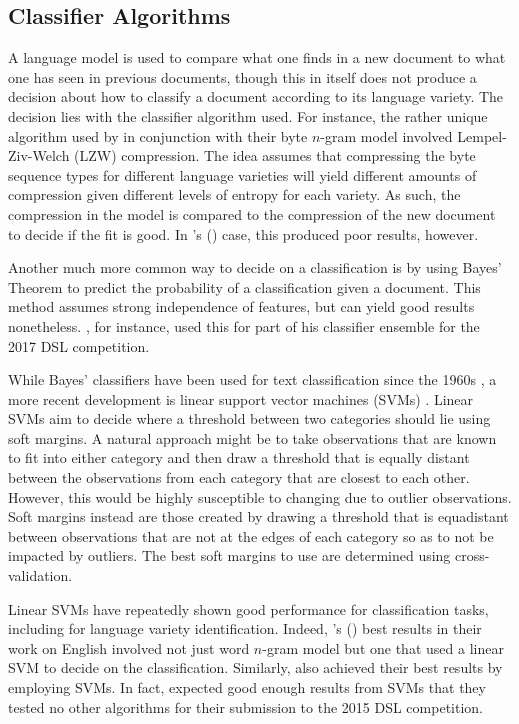 \documentclass{article}
\begin{document}
    \subsection{Classifier Algorithms}
      A language model is used to compare what one finds in a new document to what one has seen in previous documents, though this in itself does not produce a decision about how to classify a document according to its language variety.
      The decision lies with the classifier algorithm used.
      For instance, the rather unique algorithm used by \textcite{maier_language_2014} in conjunction with their byte $n$-gram model involved Lempel-Ziv-Welch (LZW) compression.
      The idea assumes that compressing the byte sequence types for different language varieties will yield different amounts of compression given different levels of entropy for each variety.
      As such, the compression in the model is compared to the compression of the new document to decide if the fit is good.
      In \citeauthor{maier_language_2014}'s (\citeyear{maier_language_2014}) case, this produced poor results, however.

      Another much more common way to decide on a classification is by using Bayes' Theorem to predict the probability of a classification given a document.
      This method assumes strong independence of features, but can yield good results nonetheless.
      \textcite{duvenhage_short_2019}, for instance, used this for part of his classifier ensemble for the 2017 DSL competition.

      While Bayes' classifiers have been used for text classification since the 1960s \parencite{mosteller_inference_1963}, a more recent development is linear support vector machines (SVMs) \parencite{cortes_support-vector_1995}.
      Linear SVMs aim to decide where a threshold between two categories should lie using soft margins.
      A natural approach might be to take observations that are known to fit into either category and then draw a threshold that is equally distant between the observations from each category that are closest to each other.
      However, this would be highly susceptible to changing due to outlier observations.
      Soft margins instead are those created by drawing a threshold that is equadistant between observations that are not at the edges of each category so as to not be impacted by outliers.
      The best soft margins to use are determined using cross-validation.

      Linear SVMs have repeatedly shown good performance for classification tasks, including for language variety identification.
      Indeed, \citeauthor{lui_classifying_2013}'s (\citeyear{lui_classifying_2013}) best results in their work on English involved not just word $n$-gram model but one that used a linear SVM to decide on the classification.
      Similarly, \textcite{rangel_low_2018} also achieved their best results by employing SVMs.
      In fact, \textcite{malmasi_language_2015} expected good enough results from SVMs that they tested no other algorithms for their submission to the 2015 DSL competition.
\end{document}

